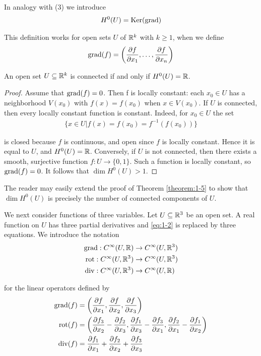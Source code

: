 In analogy with (3) we introduce
\begin{align}\label{eq:1-5}
  H^0(U) = \operatorname{Ker}(\operatorname{grad})
\end{align}

This definition works for open sets $U$ of $\mathbb{R}^k$ with $k\ge1$, when we define
\begin{align*}
  \operatorname{grad}(f) = \left(\frac{\partial f}{\partial x_1}, \ldots, \frac{\partial f}{\partial x_n}\right)
\end{align*}

\begin{theorem}\label{theorem:1-5}
  An open set $U\subseteq\mathbb{R}^k$ is connected if and only if $H^0(U) = \mathbb{R}$.
\end{theorem}

\begin{proof}
  Assume that $\operatorname{grad}(f) = 0$. Then f is locally constant: each $x_0\in U$ has
a neighborhood $V(x_0)$ with $f(x) = f(x_0)$ when $x\in V(x_0)$. If $U$ is connected,
then every locally constant function is constant. Indeed, for $x_0\in U$ the set
\begin{align*}
  \{x\in U|f(x) = f(x_0) = f^{-1}(f(x_0))\}
\end{align*}

is closed because $f$ is continuous, and open since $f$ is locally constant. Hence
it is equal to $U$, and $H^0(U) = \mathbb{R}$. Conversely, if $U$ is not connected, then there
exists a smooth, surjective function $f:U\to \{0, 1\}$. Such a function is locally
constant, so $\operatorname{grad}(f) = 0$. It follows that $\dim H^0(U) > 1$.
\end{proof}

The reader may easily extend the proof of Theorem \ref{theorem:1-5} to show that $\dim H^0(U)$
is precisely the number of connected components of $U$.


We next consider functions of three variables. Let $U\subseteq\mathbb{R}^3$ be an open set. A real
function on $U$ has three partial derivatives and \eqref{eq:1-2} is replaced by three equations.
We introduce the notation 
\begin{align*}
  \operatorname{grad}: C^\infty(U, \mathbb{R}) & \to C^\infty(U, \mathbb{R}^3) \\
  \operatorname{rot}: C^\infty(U, \mathbb{R}^3) & \to C^\infty(U, \mathbb{R}^3) \\
  \operatorname{div}: C^\infty(U, \mathbb{R}^3) & \to C^\infty(U, \mathbb{R})
\end{align*}

for the linear operators defined by
\begin{align*}
  \operatorname{grad}(f) & = \left(\frac{\partial f}{\partial x_1}, \frac{\partial f}{\partial x_2}, \frac{\partial f}{\partial x_3}\right) \\
  \operatorname{rot}(f) & = \left(\frac{\partial f_3}{\partial x_2} - \frac{\partial f_2}{\partial x_3}, \frac{\partial f_1}{\partial x_3} - \frac{\partial f_3}{\partial x_1}, \frac{\partial f_2}{\partial x_1} - \frac{\partial f_1}{\partial x_2}\right) \\
  \operatorname{div}(f) & = \frac{\partial f_1}{\partial x_1} + \frac{\partial f_2}{\partial x_2} + \frac{\partial f_3}{\partial x_3}
\end{align*}

